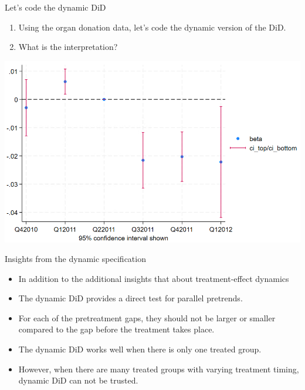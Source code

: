 \documentclass[notes,11pt, aspectratio=169]{beamer}
\begin{document}
\begin{frame}{Let's code the dynamic DiD}
    \begin{enumerate}
        \item Using the organ donation data, let's code the dynamic version of the DiD.
        \item What is the interpretation?
    \end{enumerate}
    \vspace{1cm}
    \begin{center}
        \includegraphics[width=0.6\linewidth]{24_DiDLecture/24_DiDLecture_DynamicDiD.png}
    \end{center}
\end{frame}

\begin{frame}{Insights from the dynamic specification}
\begin{itemize}
\item In addition to the additional insights that about treatment-effect dynamics
\item The dynamic DiD provides a direct test for parallel pretrends. 
\item For each of the pretreatment gaps, they should not be larger or smaller compared to the gap before the treatment takes place.
\item The dynamic DiD works well when there is only one treated group. 
\item However, when there are many treated groups with varying treatment timing, dynamic DiD can not be trusted.

\end{itemize}
\end{frame}
\end{document}
